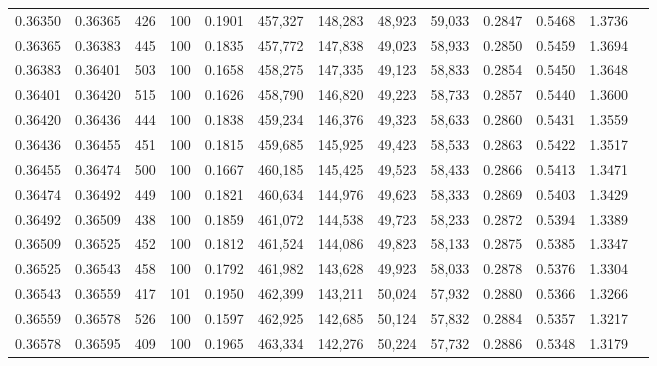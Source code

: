 \begin{tabular}{rrrrrrrrrrrrr}
0.36350 & 0.36365 &   426 & 100 &                                     0.1901 & 457,327 & 148,283 &  48,923 &  59,033 & 0.2847 & 0.5468 & 1.3736 \\
0.36365 & 0.36383 &   445 & 100 &                                     0.1835 & 457,772 & 147,838 &  49,023 &  58,933 & 0.2850 & 0.5459 & 1.3694 \\
0.36383 & 0.36401 &   503 & 100 &                                     0.1658 & 458,275 & 147,335 &  49,123 &  58,833 & 0.2854 & 0.5450 & 1.3648 \\
0.36401 & 0.36420 &   515 & 100 &                                     0.1626 & 458,790 & 146,820 &  49,223 &  58,733 & 0.2857 & 0.5440 & 1.3600 \\
0.36420 & 0.36436 &   444 & 100 &                                     0.1838 & 459,234 & 146,376 &  49,323 &  58,633 & 0.2860 & 0.5431 & 1.3559 \\
0.36436 & 0.36455 &   451 & 100 &                                     0.1815 & 459,685 & 145,925 &  49,423 &  58,533 & 0.2863 & 0.5422 & 1.3517 \\
0.36455 & 0.36474 &   500 & 100 &                                     0.1667 & 460,185 & 145,425 &  49,523 &  58,433 & 0.2866 & 0.5413 & 1.3471 \\
0.36474 & 0.36492 &   449 & 100 &                                     0.1821 & 460,634 & 144,976 &  49,623 &  58,333 & 0.2869 & 0.5403 & 1.3429 \\
0.36492 & 0.36509 &   438 & 100 &                                     0.1859 & 461,072 & 144,538 &  49,723 &  58,233 & 0.2872 & 0.5394 & 1.3389 \\
0.36509 & 0.36525 &   452 & 100 &                                     0.1812 & 461,524 & 144,086 &  49,823 &  58,133 & 0.2875 & 0.5385 & 1.3347 \\
0.36525 & 0.36543 &   458 & 100 &                                     0.1792 & 461,982 & 143,628 &  49,923 &  58,033 & 0.2878 & 0.5376 & 1.3304 \\
0.36543 & 0.36559 &   417 & 101 &                                     0.1950 & 462,399 & 143,211 &  50,024 &  57,932 & 0.2880 & 0.5366 & 1.3266 \\
0.36559 & 0.36578 &   526 & 100 &                                     0.1597 & 462,925 & 142,685 &  50,124 &  57,832 & 0.2884 & 0.5357 & 1.3217 \\
0.36578 & 0.36595 &   409 & 100 &                                     0.1965 & 463,334 & 142,276 &  50,224 &  57,732 & 0.2886 & 0.5348 & 1.3179 \\

\end{tabular}
